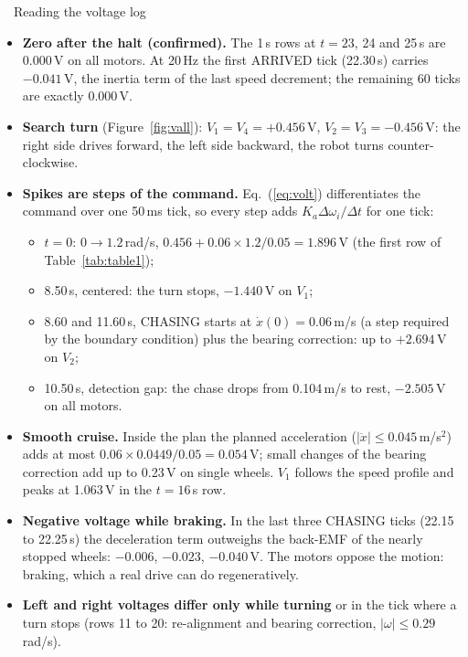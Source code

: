 \begin{purplebox}{\faSearch\ \ Reading the voltage log}
\small
\begin{itemize}
  \item \textbf{Zero after the halt (confirmed).} The 1\,s rows at $t=23$, 24 and 25\,s are 0.000\,V on all motors. At
        20\,Hz the first ARRIVED tick (22.30\,s) carries $-0.041$\,V, the inertia term of the last speed decrement;
        the remaining 60 ticks are exactly 0.000\,V.
  \item \textbf{Search turn} (Figure~\ref{fig:vall}): $V_1=V_4=+0.456$\,V, $V_2=V_3=-0.456$\,V: the right side drives forward, the left side
        backward, the robot turns counter-clockwise.
  \item \textbf{Spikes are steps of the command.} Eq.~(\ref{eq:volt}) differentiates the command over one 50\,ms tick,
        so every step adds $K_a\Delta\omega_i/\Delta t$ for one tick:
        \begin{itemize}
          \item $t=0$: $0\rightarrow1.2$\,rad/s, $0.456+0.06\times1.2/0.05=\mathbf{1.896}$\,V (the first row of
                Table~\ref{tab:table1});
          \item 8.50\,s, centered: the turn stops, $-1.440$\,V on $V_1$;
          \item 8.60 and 11.60\,s, CHASING starts at $\dot x(0)=0.06$\,m/s (a step required by the boundary
                condition) plus the bearing correction: up to $+2.694$\,V on $V_2$;
          \item 10.50\,s, detection gap: the chase drops from 0.104\,m/s to rest, $-2.505$\,V on all motors.
        \end{itemize}
  \item \textbf{Smooth cruise.} Inside the plan the planned acceleration ($|\ddot x|\le0.045$\,m/s$^2$) adds at most $0.06\times0.0449/0.05=0.054$\,V; small
        changes of the bearing correction add up to 0.23\,V on single wheels. $V_1$ follows the speed profile and
        peaks at 1.063\,V in the $t=16$\,s row.
  \item \textbf{Negative voltage while braking.} In the last three CHASING ticks (22.15 to 22.25\,s) the deceleration
        term outweighs the back-EMF of the nearly stopped wheels: $-0.006$, $-0.023$, $-0.040$\,V. The motors oppose
        the motion: braking, which a real drive can do regeneratively.
  \item \textbf{Left and right voltages differ only while turning} or in the tick where a turn stops
        (rows 11 to 20: re-alignment and bearing correction, $|\omega|\le0.29$\,rad/s).
\end{itemize}
\end{purplebox}
